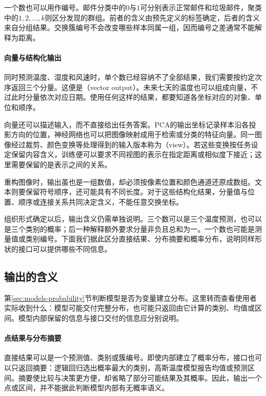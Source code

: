 一个数也可以用作编号。邮件分类中的$0$与$1$可分别表示正常邮件和垃圾邮件，聚类中的$1,2,\ldots,k$则区分发现的群组。前者的含义由预先定义的标签确定，后者的含义来自分组结果。交换簇编号不会改变哪些样本同属一组，因而编号之差通常不能解释为距离。

\paragraph{向量与结构化输出}
\label{sec:models-vector-output}

同时预测温度、湿度和风速时，单个数已经容纳不了全部结果，我们需要按约定次序返回三个分量。这便是（vector output）。未来七天的温度也可以组成向量，不过此时分量依次对应日期。使用任何这样的结果，都要知道各坐标对应的对象、单位和顺序。

向量还可以描述输入，而不直接给出任务答案。PCA的输出坐标记录样本沿各投影方向的位置，神经网络也可以把图像映射成用于检索或分类的特征向量。同一图像经过裁剪、颜色变换等处理得到的输入版本称为（view）。若这些变换按任务设定保留内容含义，训练便可以要求不同视图的表示在指定距离或相似度下接近；这里需要保留的是表示之间的关系。

重构图像时，输出虽也是一组数值，却必须按像素位置和颜色通道还原成数组。文本则要保留符号顺序，还可能具有不同长度。对于这些结构化结果，分量值与位置、顺序或连接关系共同决定含义，不能任意交换坐标。

组织形式确定以后，输出含义仍需单独说明。三个数可以是三个温度预测，也可以是三个类别的概率；后一种解释额外要求分量非负且总和为一。一个数也可能是测量值或类别编号。下面我们据此区分直接结果、分布摘要和概率分布，说明同样形状的接口可以提供哪些不同信息。

\subsection{输出的含义}
\label{sec:models-output-semantics}

第\ref{sec:models-probability}节判断模型是否为变量建立分布。这里转而查看使用者实际收到什么：模型可能交付完整分布，也可能只返回由它计算的类别、均值或区间。模型内部保留的信息与接口交付的信息应分别说明。

\paragraph{点结果与分布摘要}

直接结果可以是一个预测值、类别或簇编号。即使内部建立了概率分布，接口也可以只返回摘要：逻辑回归选出概率最大的类别，高斯温度模型报告均值或预测区间。摘要使比较与决策更方便，却省略了部分可能结果及其概率。因此，输出一个点或区间，并不能据此判断模型内部有无概率语义。

